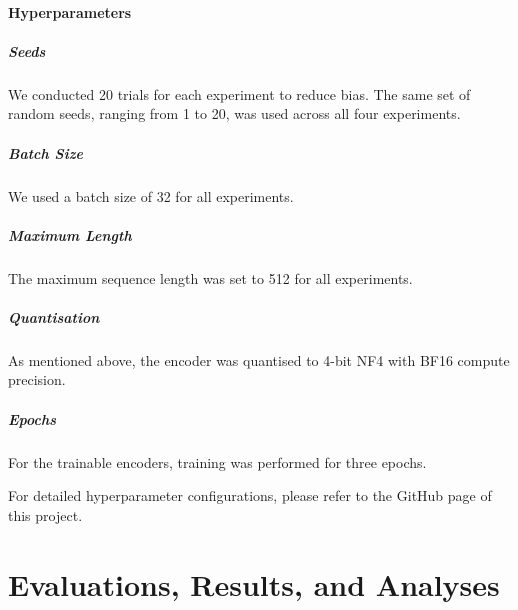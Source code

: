 \documentclass[12pt]{article}
\begin{document}
\paragraph{Hyperparameters}

\subparagraph{Seeds}
We conducted 20 trials for each experiment to reduce bias. 
The same set of random seeds, ranging from 1 to 20, was used across all four experiments.

\subparagraph{Batch Size}
We used a batch size of 32 for all experiments.

\subparagraph{Maximum Length}
The maximum sequence length was set to 512 for all experiments.

\subparagraph{Quantisation}
As mentioned above, the encoder was quantised to 4-bit NF4 with BF16 compute precision.

\subparagraph{Epochs}
For the trainable encoders, training was performed for three epochs.

For detailed hyperparameter configurations, please refer to the GitHub page of this project.


\section{Evaluations, Results, and Analyses}
\end{document}

